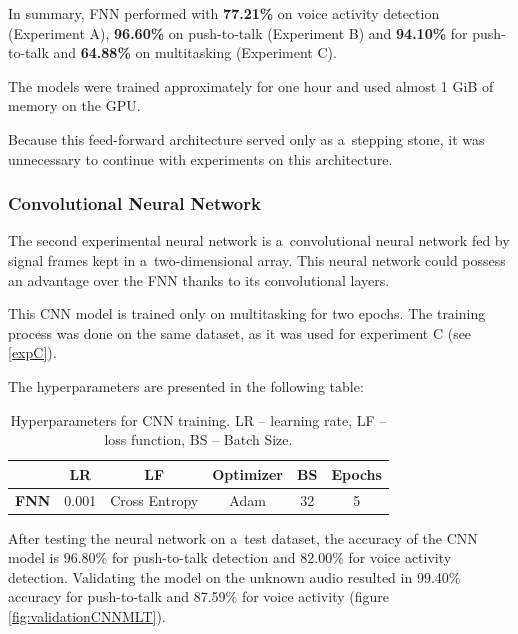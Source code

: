     
    In summary, FNN performed with \textbf{77.21\%} on voice activity detection (Experiment A), \textbf{96.60\%} on push-to-talk (Experiment B) and \textbf{94.10\%} for push-to-talk and \textbf{64.88\%} on multitasking (Experiment C).
    
    The models were trained approximately for one hour and used almost 1 GiB of memory on the GPU. 
    
    Because this feed-forward architecture served only as a~stepping stone, it was unnecessary to continue with experiments on this architecture. 

    \newpage

    \subsubsection{Convolutional Neural Network}

    The second experimental neural network is a~convolutional neural network fed by signal frames kept in a~two-dimensional array. This neural network could possess an advantage over the FNN thanks to its convolutional layers.

    This CNN model is trained only on multitasking for two epochs. The training process was done on  the same dataset, as it was used for experiment C (see \ref{expC}).

    The hyperparameters are presented in the following table:

    \begin{table}[!h]
    \begin{center}
    \begin{tabular}{|c|c|c|c|c|c|}\hline 
        & \textbf{LR} & \textbf{LF} & \textbf{Optimizer} & \textbf{BS} & \textbf{Epochs} \\ \hline
        \textbf{FNN} & 0.001 & Cross Entropy & Adam & 32 & 5\\ \hline
    \end{tabular}
    \caption{Hyperparameters for CNN training. LR – learning rate, LF – loss function, BS – Batch Size.}
    \label{tableparametersCNN}
    \end{center}
    \end{table}
    
    
    After testing the neural network on a~test dataset, the accuracy of the CNN model is 96.80\% for push-to-talk detection and 82.00\% for voice activity detection. Validating the model on the unknown audio resulted in 99.40\% accuracy for push-to-talk and 87.59\% for voice activity (figure \ref{fig:validationCNNMLT}).

